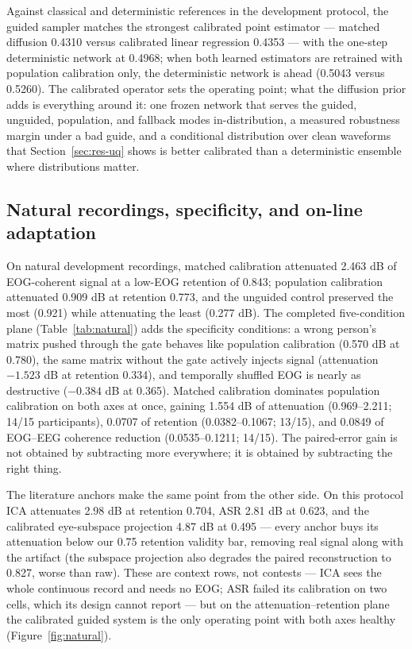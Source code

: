 Against classical and deterministic references in the development protocol, the guided sampler matches the strongest calibrated point estimator --- matched diffusion 0.4310 versus calibrated linear regression 0.4353 --- with the one-step deterministic network at 0.4968; when both learned estimators are retrained with population calibration only, the deterministic network is ahead (0.5043 versus 0.5260). The calibrated operator sets the operating point; what the diffusion prior adds is everything around it: one frozen network that serves the guided, unguided, population, and fallback modes in-distribution, a measured robustness margin under a bad guide, and a conditional distribution over clean waveforms that Section~\ref{sec:res-uq} shows is better calibrated than a deterministic ensemble where distributions matter.

\subsection{Natural recordings, specificity, and on-line adaptation}
\label{sec:res-natural}

On natural development recordings, matched calibration attenuated 2.463 dB of EOG-coherent signal at a low-EOG retention of 0.843; population calibration attenuated 0.909 dB at retention 0.773, and the unguided control preserved the most (0.921) while attenuating the least (0.277 dB). The completed five-condition plane (Table~\ref{tab:natural}) adds the specificity conditions: a wrong person's matrix pushed through the gate behaves like population calibration (0.570 dB at 0.780), the same matrix without the gate actively injects signal (attenuation $-1.523$ dB at retention 0.334), and temporally shuffled EOG is nearly as destructive ($-0.384$ dB at 0.365). Matched calibration dominates population calibration on both axes at once, gaining 1.554 dB of attenuation (0.969--2.211; 14/15 participants), 0.0707 of retention (0.0382--0.1067; 13/15), and 0.0849 of EOG--EEG coherence reduction (0.0535--0.1211; 14/15). The paired-error gain is not obtained by subtracting more everywhere; it is obtained by subtracting the right thing.

The literature anchors make the same point from the other side. On this protocol ICA attenuates 2.98 dB at retention 0.704, ASR 2.81 dB at 0.623, and the calibrated eye-subspace projection 4.87 dB at 0.495 --- every anchor buys its attenuation below our 0.75 retention validity bar, removing real signal along with the artifact (the subspace projection also degrades the paired reconstruction to 0.827, worse than raw). These are context rows, not contests --- ICA sees the whole continuous record and needs no EOG; ASR failed its calibration on two cells, which its design cannot report --- but on the attenuation--retention plane the calibrated guided system is the only operating point with both axes healthy (Figure~\ref{fig:natural}).

